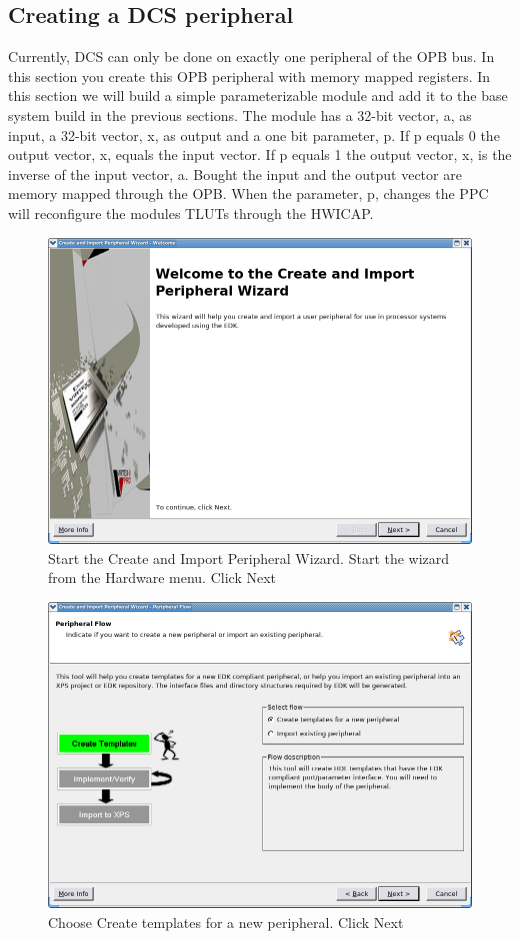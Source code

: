 \documentclass[a4paper,oneside]{memoir}
\begin{document}
\subsection{Creating a DCS peripheral}
Currently, DCS can only be done on exactly one peripheral of the OPB bus. In this section you create this OPB peripheral with memory mapped registers.
In this section we will build a simple parameterizable module and add it to the base system build in the previous sections. The module has a 32-bit vector, a, as input, a 32-bit vector, x, as output and a one bit parameter, p. If p equals 0 the output vector, x, equals the input vector. If p equals 1 the output vector, x, is the inverse of the input vector, a. Bought the input and the output vector are memory mapped through the OPB. When the parameter, p, changes the PPC will reconfigure the modules TLUTs through the HWICAP.
\begin{figure}[H]
\centering
\includegraphics[scale=0.5]{COIP1}
\caption{Start the Create and Import Peripheral Wizard. Start the wizard from the Hardware menu. Click Next\label{fig:COIP1}}
\end{figure}
\begin{figure}[H]
\centering
\includegraphics[scale=0.5]{COIP2}
\caption{Choose Create templates for a new peripheral. Click Next\label{fig:COIP2}}
\end{figure}
\end{document}
